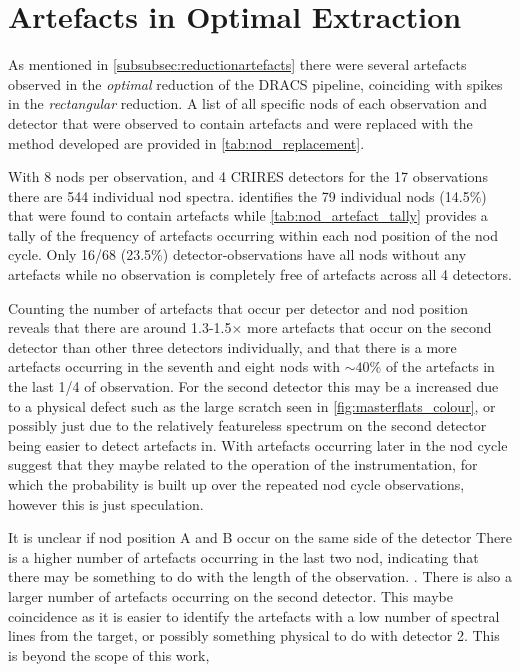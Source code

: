 
\chapter{Artefacts in Optimal Extraction}
\label{appendix:artefacts}





As mentioned in \cref{subsubsec:reductionartefacts} there were several artefacts observed in the \emph{optimal} reduction of the {DRACS} pipeline, coinciding with spikes in the \emph{rectangular} reduction.
A list of all specific nods of each observation and detector that were observed to contain artefacts and were replaced with the method developed are provided in \cref{tab:nod_replacement}.

With 8 nods per observation, and 4 {CRIRES} detectors for the 17 observations there are 544 individual nod spectra.
 identifies the 79 individual nods (14.5\%) that were found to contain artefacts while \cref{tab:nod_artefact_tally} provides a tally of the frequency of artefacts occurring within each nod position of the nod cycle.
Only 16/68 (23.5\%) detector-observations have all nods without any artefacts while no observation is completely free of artefacts across all 4 detectors.

Counting the number of artefacts that occur per detector and nod position reveals that there are around 1.3-1.5$\times$ more artefacts that occur on the second detector than other three detectors individually, and that there is a more artefacts occurring in the seventh and eight nods with $\sim40$\% of the artefacts in the last 1/4 of observation.
For the second detector this may be a increased due to a physical defect such as the large scratch seen in \cref{fig:masterflats_colour}, or possibly just due to the relatively featureless spectrum on the second detector being easier to detect artefacts in. With artefacts occurring later in the nod cycle suggest that they maybe related to the operation of the instrumentation, for which the probability is built up over the repeated nod cycle observations, however this is just speculation. 

It is unclear if nod position A and B occur on the same side of the detector 
There is a higher number of artefacts occurring in the last two nod, indicating that there may be something to do with the length of the observation. .
There is also a larger number of artefacts occurring on the second detector.
This maybe coincidence as it is easier to identify the artefacts with a low number of spectral lines from the target, or possibly something physical to do with detector 2.
This is beyond the scope of this work, 


